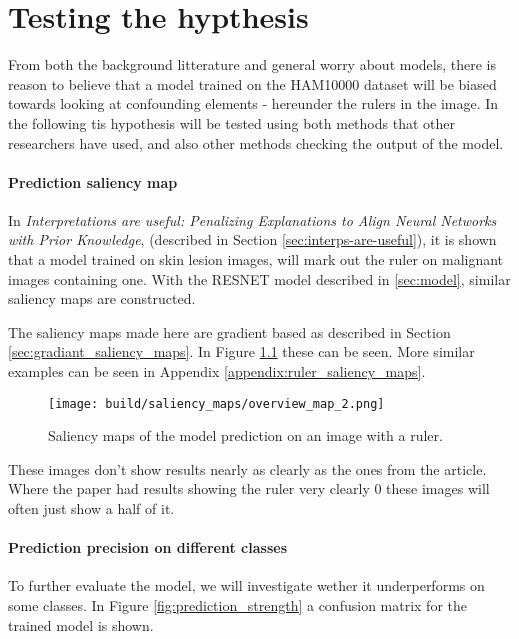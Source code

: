 \chapter{Testing the hypthesis}
From both the background litterature and general worry about models,
there is reason to believe that a model trained on the HAM10000 dataset will be biased
towards looking at confounding elements - hereunder the rulers in the image.
In the following tis hypothesis will be tested using both methods that other researchers have used,
and also other methods checking the output of the model.

\subsubsection{Prediction saliency map}\label{sec:prediction-saliency-map}
In \textit{Interpretations are useful: Penalizing Explanations to Align Neural Networks with Prior Knowledge}\cite{interps-are-useful},
(described in Section \ref{sec:interps-are-useful}), it is shown that a model trained on skin lesion images,
will mark out the ruler on malignant images containing one.
With the RESNET model described in \ref{sec:model}, similar saliency maps are constructed.

The saliency maps made here are gradient based as described in Section \ref{sec:gradiant_saliency_maps}.
In Figure \ref{fig:ruler_saliency_map} these can be seen.
More similar examples can be seen in Appendix \ref{appendix:ruler_saliency_maps}.

\begin{figure}[h]
    \texttt{[image: build/saliency\_maps/overview\_map\_2.png]}
    \caption{Saliency maps of the model prediction on an image with a ruler.}
    \label{fig:ruler_saliency_map}
\end{figure}

These images don't show results nearly as clearly as the ones from the article.
Where the paper had results showing the ruler very clearly 0 these images will often just show a half of it.

\subsubsection{Prediction precision on different classes}
To further evaluate the model, we will investigate wether it underperforms on some classes.
In Figure \ref{fig:prediction_strength} a confusion matrix for the trained model is shown.

